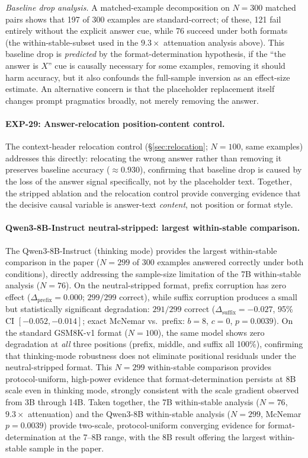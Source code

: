 \documentclass{article}
\theoremstyle{definition}
\theoremstyle{definition}
\newcommand{\PCTXN}{100}
\newcommand{\PCTXSTDACC}{0.930}
\begin{document}
\emph{Baseline drop analysis.}
A matched-example decomposition on $N{=}300$ matched pairs shows that 197 of 300 examples are standard-correct; of these, 121 fail entirely without the explicit answer cue, while 76 succeed under both formats (the within-stable-subset used in the $9.3\times$ attenuation analysis above). This baseline drop is \emph{predicted} by the format-determination
hypothesis, if the ``the answer is $X$'' cue is causally necessary for some
examples, removing it should harm accuracy, but it also confounds the
full-sample inversion as an effect-size estimate.
An alternative concern is that the placeholder replacement itself changes
prompt pragmatics broadly, not merely removing the answer.
\paragraph{EXP-29: Answer-relocation position-content control.}
The context-header relocation control (\S\ref{sec:relocation}; $N{=}\PCTXN$,
same examples) addresses this directly: relocating the wrong answer rather
than removing it preserves baseline accuracy ($\approx\PCTXSTDACC$), confirming
that baseline drop is caused by the loss of the answer signal specifically,
not by the placeholder text. Together, the stripped ablation and the relocation
control provide converging evidence that the decisive causal variable is
answer-text \emph{content}, not position or format style.

\paragraph{Qwen3-8B-Instruct neutral-stripped: largest within-stable comparison.}
The Qwen3-8B-Instruct (thinking mode) provides the largest within-stable
comparison in the paper ($N{=}299$ of 300 examples answered correctly under
both conditions), directly addressing the sample-size limitation of the 7B
within-stable analysis ($N{=}76$).
On the neutral-stripped format, prefix corruption has zero effect
($\Delta_\text{prefix}{=}0.000$; $299/299$ correct), while suffix corruption
produces a small but statistically significant degradation:
$291/299$ correct ($\Delta_\text{suffix}{=}{-}0.027$,
95\% CI $[-0.052, -0.014]$; exact McNemar vs.\ prefix: $b{=}8$, $c{=}0$,
$p{=}0.0039$).
On the standard GSM8K-v1 format ($N{=}100$), the same model shows zero degradation
at \emph{all} three positions (prefix, middle, and suffix all 100\%), confirming
that thinking-mode robustness does not eliminate positional residuals under the
neutral-stripped format.
This $N{=}299$ within-stable comparison provides protocol-uniform, high-power
evidence that format-determination persists at 8B scale even in thinking mode,
strongly consistent with the scale gradient observed from 3B through 14B.
Taken together, the 7B within-stable analysis ($N{=}76$, $9.3\times$ attenuation) and
the Qwen3-8B within-stable analysis ($N{=}299$, McNemar $p{=}0.0039$) provide
two-scale, protocol-uniform converging evidence for format-determination at the 7--8B
range, with the 8B result offering the largest within-stable sample in the paper.
\end{document}
